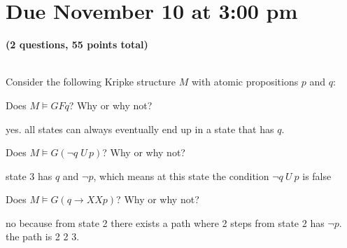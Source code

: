\documentclass[11pt]{article}
\begin{document}
\maketitle

\section*{Due November 10 at 3:00 pm}

\textbf{(2 questions, 55 points total)}

\begin{qunlist}

  \\
  Consider the following Kripke structure $M$ with atomic propositions $p$ and $q$:


  \begin{qparts}
  \item
    Does $M \models GFq$? Why or why not?

    \begin{answer}
      yes. all states can always eventually end up in a state that has \(q\).

    \end{answer}

  \item
    Does $M \models G(\lnot q \; U \, p)$? Why or why not?

    \begin{answer}
      state 3 has \(q\) and \(\neg p\), which means at this state the condition \(\neg q ~ U ~ p\) is false
    \end{answer}

  \item
    Does $M \models G(q \rightarrow XX p)$? Why or why not?

    \begin{answer}
      no because from state 2 there exists a path where 2 steps from state 2 has \(\neg p\). the path is 2 2 3.


\end{answer}
\end{qparts}
\end{qunlist}
\end{document}

